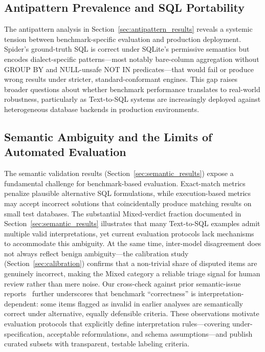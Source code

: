 \documentclass[]{einformatica}
\begin{document}
\subsection{Antipattern Prevalence and SQL Portability}

The antipattern analysis in Section~\ref{sec:antipattern_results} reveals a systemic tension between benchmark-specific evaluation and production deployment. Spider's ground-truth SQL is correct under SQLite's permissive semantics but encodes dialect-specific patterns---most notably bare-column aggregation without GROUP BY and NULL-unsafe NOT IN predicates---that would fail or produce wrong results under stricter, standard-conformant engines. This gap raises broader questions about whether benchmark performance translates to real-world robustness, particularly as Text-to-SQL systems are increasingly deployed against heterogeneous database backends in production environments.

\subsection{Semantic Ambiguity and the Limits of Automated Evaluation}

The semantic validation results (Section~\ref{sec:semantic_results}) expose a fundamental challenge for benchmark-based evaluation. Exact-match metrics penalize plausible alternative SQL formulations, while execution-based metrics may accept incorrect solutions that coincidentally produce matching results on small test databases. The substantial Mixed-verdict fraction documented in Section~\ref{sec:semantic_results} illustrates that many Text-to-SQL examples admit multiple valid interpretations, yet current evaluation protocols lack mechanisms to accommodate this ambiguity. At the same time, inter-model disagreement does not always reflect benign ambiguity---the calibration study (Section~\ref{sec:calibration}) confirms that a non-trivial share of disputed items are genuinely incorrect, making the Mixed category a reliable triage signal for human review rather than mere noise. Our cross-check against prior semantic-issue reports~\cite{liu2025nl2sqlbugs} further underscores that benchmark ``correctness'' is interpretation-dependent: some items flagged as invalid in earlier analyses are semantically correct under alternative, equally defensible criteria. These observations motivate evaluation protocols that explicitly define interpretation rules---covering under-specification, acceptable reformulations, and schema assumptions---and publish curated subsets with transparent, testable labeling criteria.
\end{document}
